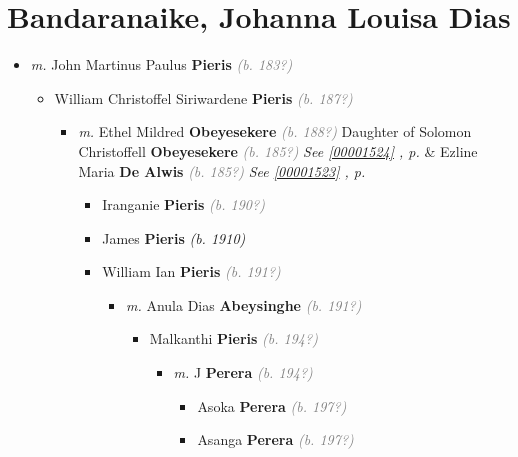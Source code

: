 \documentclass[10pt, openany]{book}
\begin{document}
\chapter{Bandaranaike, Johanna Louisa Dias}
\label{00001677}
\textcolor{slmaroon}{\textit{}}
\begin{itemize}
\item{\textit{m.} John Martinus Paulus \textbf{Pieris} \textcolor{gray}{\textit{(b. 183?)}}   \label{couple:00001677:00001678} \begin{itemize}
\item{William Christoffel Siriwardene \textbf{Pieris} \textcolor{gray}{\textit{(b. 187?)}}
\begin{itemize}
\item{\textit{m.} Ethel Mildred \textbf{Obeyesekere} \textcolor{gray}{\textit{(b. 188?)}} Daughter of  Solomon Christoffell \textbf{Obeyesekere} \textcolor{gray}{\textit{(b. 185?)}} \textcolor{slteal}{\textit{See  \autoref{00001524} \textit{, p. \pageref{00001524} }}}  \&  Ezline Maria \textbf{De Alwis} \textcolor{gray}{\textit{(b. 185?)}} \textcolor{slteal}{\textit{See  \autoref{00001523} \textit{, p. \pageref{00001523} }}}   \label{couple:00001568:00001569} \begin{itemize}
\item{Iranganie \textbf{Pieris} \textcolor{gray}{\textit{(b. 190?)}}
 }
\item{James \textbf{Pieris} \textcolor{slorange}{\textit{(b. 1910)}}
 }
\item{William Ian \textbf{Pieris} \textcolor{gray}{\textit{(b. 191?)}}
\begin{itemize}
\item{\textit{m.} Anula Dias \textbf{Abeysinghe} \textcolor{gray}{\textit{(b. 191?)}}   \label{couple:00001570:00001571} \begin{itemize}
\item{Malkanthi \textbf{Pieris} \textcolor{gray}{\textit{(b. 194?)}}
\begin{itemize}
\item{\textit{m.} J \textbf{Perera} \textcolor{gray}{\textit{(b. 194?)}}   \label{couple:00001573:00001574} \begin{itemize}
\item{Asoka \textbf{Perera} \textcolor{gray}{\textit{(b. 197?)}}
 }
\item{Asanga \textbf{Perera} \textcolor{gray}{\textit{(b. 197?)}}
 }
\end{itemize}}

\end{itemize}}
\end{itemize}}
\end{itemize}}
\end{itemize}}
\end{itemize}}
\end{itemize}}
\end{itemize}
\end{document}

